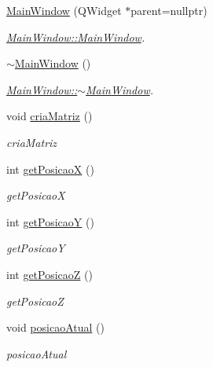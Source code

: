 \begin{DoxyCompactItemize}
\item 
\mbox{\hyperlink{classMainWindow_a996c5a2b6f77944776856f08ec30858d}{Main\+Window}} (Q\+Widget $\ast$parent=nullptr)
\begin{DoxyCompactList}\small\item\em \mbox{\hyperlink{classMainWindow_a996c5a2b6f77944776856f08ec30858d}{Main\+Window\+::\+Main\+Window}}. \end{DoxyCompactList}\item 
\mbox{\hyperlink{classMainWindow_ae98d00a93bc118200eeef9f9bba1dba7}{$\sim$\+Main\+Window}} ()
\begin{DoxyCompactList}\small\item\em \mbox{\hyperlink{classMainWindow_ae98d00a93bc118200eeef9f9bba1dba7}{Main\+Window\+::$\sim$\+Main\+Window}}. \end{DoxyCompactList}\item 
\mbox{\label{classMainWindow_a7627fd74185aeaef292e97d081026ea7}} 
void \mbox{\hyperlink{classMainWindow_a7627fd74185aeaef292e97d081026ea7}{cria\+Matriz}} ()
\begin{DoxyCompactList}\small\item\em cria\+Matriz \end{DoxyCompactList}\item 
int \mbox{\hyperlink{classMainWindow_a90c9a234855070a1629ee1b85cabb7d0}{get\+PosicaoX}} ()
\begin{DoxyCompactList}\small\item\em get\+PosicaoX \end{DoxyCompactList}\item 
int \mbox{\hyperlink{classMainWindow_a79dd8ed86b37fd50a4f15293960adf16}{get\+PosicaoY}} ()
\begin{DoxyCompactList}\small\item\em get\+PosicaoY \end{DoxyCompactList}\item 
int \mbox{\hyperlink{classMainWindow_a91cc6b0f1be1fae34eae724789370906}{get\+PosicaoZ}} ()
\begin{DoxyCompactList}\small\item\em get\+PosicaoZ \end{DoxyCompactList}\item 
void \mbox{\hyperlink{classMainWindow_aaa69318d2e78939d276d2aff84b66fae}{posicao\+Atual}} ()
\begin{DoxyCompactList}\small\item\em posicao\+Atual \end{DoxyCompactList}\end{DoxyCompactItemize}


